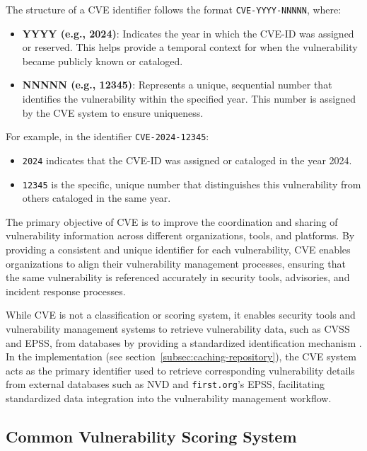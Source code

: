 The structure of a \ac{CVE} identifier follows the format \texttt{CVE-YYYY-NNNNN}, where:
\begin{itemize}
    \item \textbf{YYYY (e.g., 2024)}: Indicates the year in which the CVE-ID was assigned or reserved. This helps provide a temporal context for when the vulnerability became publicly known or cataloged.
    \item \textbf{NNNNN (e.g., 12345)}: Represents a unique, sequential number that identifies the vulnerability within the specified year. This number is assigned by the \ac{CVE} system to ensure uniqueness.
\end{itemize}

For example, in the identifier \texttt{CVE-2024-12345}:
\begin{itemize}
    \item \texttt{2024} indicates that the CVE-ID was assigned or cataloged in the year 2024.
    \item \texttt{12345} is the specific, unique number that distinguishes this vulnerability from others cataloged in the same year.
\end{itemize}

The primary objective of \ac{CVE} is to improve the coordination and sharing of vulnerability information across different organizations, tools, and platforms. By providing a consistent and unique identifier for each vulnerability, \ac{CVE} enables organizations to align their vulnerability management processes, ensuring that the same vulnerability is referenced accurately in security tools, advisories, and incident response processes.

While \ac{CVE} is not a classification or scoring system, it enables security tools and vulnerability management systems to retrieve vulnerability data, such as \ac{CVSS} and \ac{EPSS}, from databases by providing a standardized identification mechanism \autocite{mitre_corporation_overview_2024}. In the implementation (see section~\ref{subsec:caching-repository}), the \ac{CVE} system acts as the primary identifier used to retrieve corresponding vulnerability details from external databases such as \ac{NVD} and \texttt{first.org}'s \ac{EPSS}, facilitating standardized data integration into the vulnerability management workflow.

\subsection{Common Vulnerability Scoring System}
\label{subsec:common-vulnerability-scoring-system}

